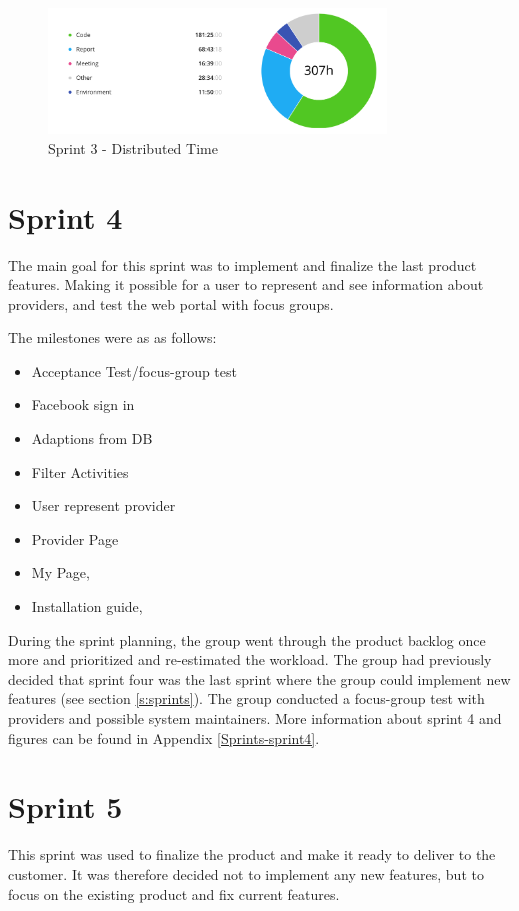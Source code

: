 \begin{figure}[ht]
\centering
    \includegraphics[width=0.8\textwidth]{fig/sprint3-diagram}
\caption{Sprint 3 - Distributed Time}
\label{Hours_Diagram_Sprint3}
\end{figure}

\section{Sprint 4}
\label{sprint4}
The main goal for this sprint was to implement and finalize the last product features. Making it possible for a user to represent and see information about providers, and test the web portal with focus groups.  

The milestones were as as follows: 
\begin{itemize}[noitemsep]
    \item Acceptance Test/focus-group test
    \item Facebook sign in
    \item Adaptions from DB
    \item Filter Activities
    \item User represent provider 
    \item Provider Page
    \item My Page, 
    \item Installation guide, 
\end{itemize}

During the sprint planning, the group went through the product backlog once more and prioritized and re-estimated the workload. The group had previously decided that sprint four was the last sprint where the group could implement new features (see section \ref{s:sprints}). The group conducted a focus-group test with providers and possible system maintainers. More information about sprint 4 and figures can be found in Appendix \ref{Sprints-sprint4}.


\section{Sprint 5}
\label{sprint5}
This sprint was used to finalize the product and make it ready to deliver to the customer. It was therefore decided not to implement any new features, but to focus on the existing product and fix current features. 

